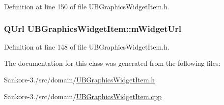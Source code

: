 Definition at line 150 of file U\-B\-Graphics\-Widget\-Item.\-h.

\hypertarget{class_u_b_graphics_widget_item_a4066b298b5119e0058f5f12282322ffa}{
\subsubsection[{m\-Widget\-Url}]{\setlength{\rightskip}{0pt plus 5cm}Q\-Url U\-B\-Graphics\-Widget\-Item\-::m\-Widget\-Url\hspace{0.3cm}{\ttfamily [protected]}}}\label{d0/d16/class_u_b_graphics_widget_item_a4066b298b5119e0058f5f12282322ffa}


Definition at line 148 of file U\-B\-Graphics\-Widget\-Item.\-h.



The documentation for this class was generated from the following files\-:\begin{DoxyCompactItemize}
\item 
Sankore-\/3./src/domain/\hyperlink{_u_b_graphics_widget_item_8h}{U\-B\-Graphics\-Widget\-Item.\-h}\item 
Sankore-\/3./src/domain/\hyperlink{_u_b_graphics_widget_item_8cpp}{U\-B\-Graphics\-Widget\-Item.\-cpp}\end{DoxyCompactItemize}
